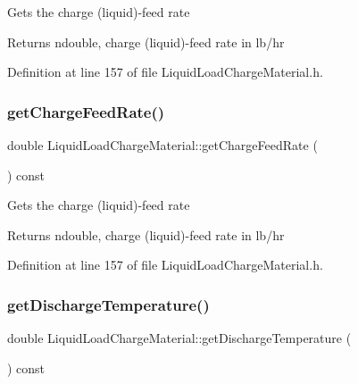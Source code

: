 Gets the charge (liquid)-\/feed rate \begin{DoxyReturn}{Returns}
ndouble, charge (liquid)-\/feed rate in lb/hr 
\end{DoxyReturn}


Definition at line 157 of file Liquid\+Load\+Charge\+Material.\+h.

\mbox{\label{class_liquid_load_charge_material_af818c541527b3b28a8f84a08dc0c884e}} 
\subsubsection{\texorpdfstring{get\+Charge\+Feed\+Rate()}{getChargeFeedRate()}\hspace{0.1cm}{\footnotesize\ttfamily [3/3]}}
{\footnotesize\ttfamily double Liquid\+Load\+Charge\+Material\+::get\+Charge\+Feed\+Rate (\begin{DoxyParamCaption}{ }\end{DoxyParamCaption}) const\hspace{0.3cm}{\ttfamily [inline]}}

Gets the charge (liquid)-\/feed rate \begin{DoxyReturn}{Returns}
ndouble, charge (liquid)-\/feed rate in lb/hr 
\end{DoxyReturn}


Definition at line 157 of file Liquid\+Load\+Charge\+Material.\+h.

\mbox{\label{class_liquid_load_charge_material_ad474f33059c99aa94e1d63738e11ff0e}} 
\subsubsection{\texorpdfstring{get\+Discharge\+Temperature()}{getDischargeTemperature()}\hspace{0.1cm}{\footnotesize\ttfamily [1/3]}}
{\footnotesize\ttfamily double Liquid\+Load\+Charge\+Material\+::get\+Discharge\+Temperature (\begin{DoxyParamCaption}{ }\end{DoxyParamCaption}) const\hspace{0.3cm}{\ttfamily [inline]}}

